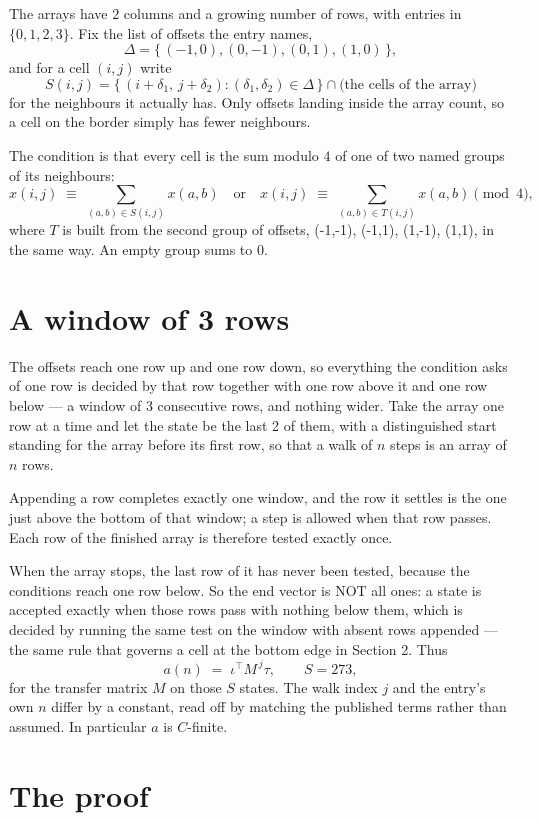 \documentclass[11pt,a4paper]{article}
\theoremstyle{plain}
\theoremstyle{definition}
\begin{document}
The arrays have $2$ columns and a growing number of rows, with entries in $\{0,1,2,3\}$. Fix the
list of offsets the entry names,
\[
\Delta=\{\,(-1,0), (0,-1), (0,1), (1,0)\,\},
\]
and for a cell $(i,j)$ write
\[
S(i,j)=\{\,(i+\delta_1,\,j+\delta_2) : (\delta_1,\delta_2)\in\Delta\,\}\cap
\text{(the cells of the array)}
\]
for the neighbours it actually has. Only offsets landing inside the array count, so a cell on
the border simply has fewer neighbours.

The condition is that every cell is the sum modulo $4$ of one of two named groups of its neighbours:
\[
x(i,j)\;\equiv\;\sum_{(a,b)\in S(i,j)}x(a,b) \quad\text{or}\quad x(i,j)\;\equiv\;\sum_{(a,b)\in T(i,j)}x(a,b) \pmod{4},
\]
where $T$ is built from the second group of offsets, (-1,-1), (-1,1), (1,-1), (1,1), in the same way. An empty group sums to $0$.

\section{A window of 3 rows}

The offsets reach one row up and one row down, so everything the condition asks of one row is
decided by that row together with one row above it and one row below --- a window of
$3$ consecutive rows, and nothing wider. Take the array one row at a time
and let the state be the last 2 of them, with a distinguished start standing for the
array before its first row, so that a walk of $n$ steps is an array of $n$ rows.

Appending a row completes exactly one window, and the row it settles is the one just above the bottom of that window; a step is
allowed when that row passes. Each row of the finished
array is therefore tested exactly once.

When the array stops, the last row of it has never been tested, because the
conditions reach one row below. So the end vector is NOT all ones: a state is accepted exactly when
those rows pass with nothing below them, which is decided by running the same test on the window
with absent rows appended --- the same rule that governs a cell at the bottom edge in
Section 2.
Thus
\[
a(n)\;=\;\iota^{\!\top}M^{\,j}\tau ,\qquad S=273,
\]
for the transfer matrix $M$ on those $S$ states. The walk index $j$ and the entry's own $n$
differ by a constant, read off by matching the published terms rather than assumed. In
particular $a$ is $C$-finite.

\section{The proof}
\end{document}

